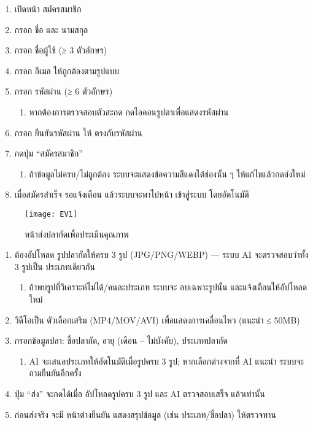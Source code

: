 \begin{sloppypar}
	\begin{enumerate}
		\item เปิดหน้า สมัครสมาชิก
		\item กรอก ชื่อ และ นามสกุล
		\item กรอก ชื่อผู้ใช้ (≥ 3 ตัวอักษร)
		\item กรอก อีเมล ให้ถูกต้องตามรูปแบบ
		\item กรอก รหัสผ่าน (≥ 6 ตัวอักษร)
		\begin{enumerate}
			\item หากต้องการตรวจสอบตัวสะกด กดไอคอนรูปตาเพื่อแสดงรหัสผ่าน
		\end{enumerate}
		\item กรอก ยืนยันรหัสผ่าน ให้ ตรงกับรหัสผ่าน
		\item กดปุ่ม “สมัครสมาชิก”
		\begin{enumerate}
			\item ถ้าข้อมูลไม่ครบ/ไม่ถูกต้อง ระบบจะแสดงข้อความสีแดงใต้ช่องนั้น ๆ ให้แก้ไขแล้วกดส่งใหม่
		\end{enumerate}
		\item เมื่อสมัครสำเร็จ รอแจ้งเตือน แล้วระบบจะพาไปหน้า เข้าสู่ระบบ โดยอัตโนมัติ
	\end{enumerate}
\end{sloppypar}

\begin{figure}[h]
	\centering
	\texttt{[image: EV1]}
	\caption{หน้าส่งปลากัดเพื่อประเมินคุณภาพ}
\end{figure}

\par

\begin{sloppypar}
	\begin{enumerate}
		\item ต้องอัปโหลด รูปปลากัดให้ครบ 3 รูป (JPG/PNG/WEBP) — ระบบ AI จะตรวจสอบว่าทั้ง 3 รูปเป็น ประเภทเดียวกัน
		\begin{enumerate}
			\item ถ้าพบรูปที่วิเคราะห์ไม่ได้/คนละประเภท ระบบจะ ลบเฉพาะรูปนั้น และแจ้งเตือนให้อัปโหลดใหม่
		\end{enumerate}
		\item วิดีโอเป็น ตัวเลือกเสริม (MP4/MOV/AVI) เพื่อแสดงการเคลื่อนไหว (แนะนำ ≤ 50MB)
		\item กรอกข้อมูลปลา: ชื่อปลากัด, อายุ (เดือน – ไม่บังคับ), ประเภทปลากัด
		\begin{enumerate}
			\item AI จะเสนอประเภทให้อัตโนมัติเมื่อรูปครบ 3 รูป; หากเลือกต่างจากที่ AI แนะนำ ระบบจะถามยืนยันอีกครั้ง
		\end{enumerate}
		\item ปุ่ม “ส่ง” จะกดได้เมื่อ อัปโหลดรูปครบ 3 รูป และ AI ตรวจสอบเสร็จ แล้วเท่านั้น
		\item ก่อนส่งจริง จะมี หน้าต่างยืนยัน แสดงสรุปข้อมูล (เช่น ประเภท/ชื่อปลา) ให้ตรวจทาน
	\end{enumerate}
\end{sloppypar}

